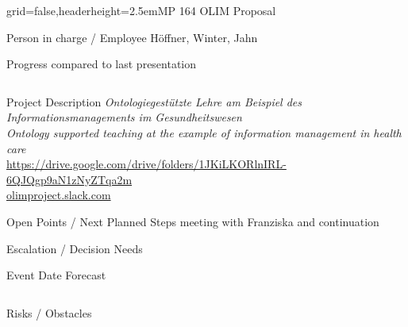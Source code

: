 \documentclass[english]{kiesgrube}
\begin{document}
\begin{poster}{grid=false,headerheight=2.5em}{}{MP 164 OLIM Proposal}{}{}
\begin{posterbox}[name=person,column=0,row=0]{Person in charge / Employee}
Höffner, Winter, Jahn
\end{posterbox}
\begin{posterbox}[name=progress,below=person]{Progress compared to last presentation}
\begin{tabulary}{\textwidth}{lL}
\end{tabulary}
\end{posterbox}
\begin{posterbox}[name=description,column=1,row=0]{Project Description}
\emph{Ontologiegestützte Lehre am Beispiel des Informationsmanagements im Gesundheitswesen}\\
\emph{Ontology supported teaching at the example of information management in health care}\\
\url{https://drive.google.com/drive/folders/1JKiLKORlnIRL-6QJQgp9aN1zNyZTqa2m}\\
\url{olimproject.slack.com}
\end{posterbox}
\begin{posterbox}[name=open,column=1,below=description]{Open Points / Next Planned Steps}
meeting with Franziska and continuation
\end{posterbox}
\begin{posterbox}[name=escalation,column=1,below=open]{Escalation / Decision Needs}
\end{posterbox}
\begin{posterbox}[name=event,below=progress,]{Event Date Forecast}
\begin{tabulary}{\textwidth}{lL}
\end{tabulary}
\end{posterbox}
\begin{posterbox}[name=event,below=event]{Risks / Obstacles}
\end{posterbox}
\footer{}
\end{poster}
\end{document}
